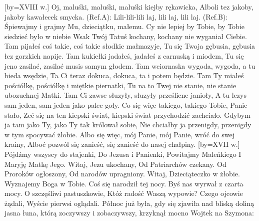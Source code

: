 [by={XVIII w.}]
\beginverse
    Oj, maluśki, maluśki, maluśki kiejby rękawicka,
    Alboli tez jakoby, jakoby kawałecek smycka.
\endverse
\beginchorus
        (Ref.A): Lili-lili-lili laj, lili laj, lili laj.
        (Ref.B): Śpiewajmy i grajmy Mu, dzieciątku, małemu.
\endchorus
\beginverse
    Cy nie lepiej by Tobie, by Tobie siedzieć było w niebie
    Wsak Twój Tatuś kochany, kochany nie wyganiał Ciebie.
\endverse
\beginverse
    Tam pijałeś coś takie, coś takie słodkie małmazyje,
    Tu się Twoja gębusia, gębusia łez gorzkich napije.
\endverse
\beginverse
    Tam kukiełki jadałeś, jadałeś z carnuską i miodem,
    Tu się jeno zasilać, zasilać musis samym głodem.
\endverse
\beginverse
    Tam wciornaska wygoda, wygoda, a tu bieda wsędzie,
    Ta Ci teraz dokuca, dokuca, ta i potem będzie.
\endverse
\beginverse
    Tam Ty miałeś pościółkę, pościółkę i miętkie piernatki,
    Tu na to Twej nie stanie, nie stanie ubozuchnej Matki.
\endverse
\beginverse
    Tam Ci zawse słuzyły, słuzyły prześlicne janioły,
    A tu lezys sam jeden, sam jeden jako palec goły.
\endverse
\beginverse
    Co się więc takiego, takiego Tobie, Panie stało,
    Zeć się na ten kiepski świat, kiepski świat przychodzić zachciało.
\endverse
\beginverse
    Gdybym ja tam jako Ty, jako Ty tak królował sobie,
    Nie chciałby ja przenigdy, przenigdy w tym spocywać żłobie.
\endverse
\beginverse
    Albo się więc, mój Panie, mój Panie, wróć do swej krainy,
    Alboć pozwól się zanieść, się zanieść do nasej chałpiny.
\endverse
\endsong
[by={XVII w.}]
\beginverse
    Pójdźmy wszyscy do stajenki,
    Do Jezusa i Panienki,
\endverse
\beginchorus
    Powitajmy Maleńkiego
    I Maryję Matkę Jego.
\endchorus
\beginverse
    Witaj, Jezu ukochany,
    Od Patriarchów czekany.
\endverse
\beginchorus
    Od Proroków ogłoszony,
    Od narodów upragniony.
\endchorus
\beginverse
    Witaj, Dzieciąteczko w żłobie.
    Wyznajemy Boga w Tobie.
\endverse
\beginchorus
    Coś się narodził tej nocy.
    Byś nas wyrwał z czarta mocy.
\endchorus
\beginverse
    O szczęśliwi pastuszkowie,
    Któż radość Waszą wypowie?
\endverse
\beginchorus
    Czego ojcowie żądali,
    Wyście pierwsi oglądali.
\endchorus
\endsong
\beginverse
Północ już była, gdy się zjawiła
nad bliską doliną jasna łuna,
którą zoczywszy i zobaczywszy,
krzyknął mocno Wojtek na Szymona:
\endverse
